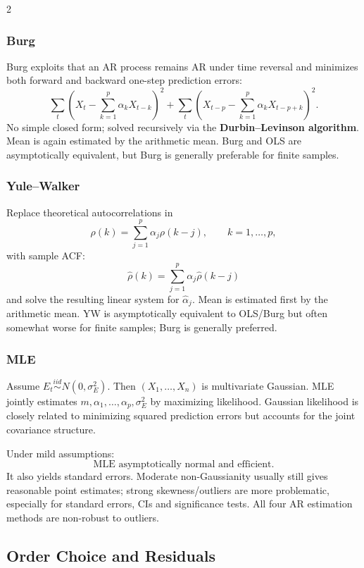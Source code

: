 \documentclass[9pt,a4paper]{extarticle}
\newcommand{\key}[1]{\textbf{#1}}
\begin{document}
\begin{multicols}{2}
\subsubsection*{Burg}

Burg exploits that an AR process remains AR under time reversal and minimizes both forward and backward one-step prediction errors:
\[
\sum_t\left(X_t-\sum_{k=1}^p\alpha_kX_{t-k}\right)^2+
\sum_t\left(X_{t-p}-\sum_{k=1}^p\alpha_kX_{t-p+k}\right)^2.
\]
No simple closed form; solved recursively via the \key{Durbin--Levinson algorithm}. Mean is again estimated by the arithmetic mean. Burg and OLS are asymptotically equivalent, but Burg is generally preferable for finite samples.

\subsubsection*{Yule--Walker}

Replace theoretical autocorrelations in
\[
\rho(k)=\sum_{j=1}^p\alpha_j\rho(k-j),\qquad k=1,\ldots,p,
\]
with sample ACF:
\[
\boxed{\widehat\rho(k)=\sum_{j=1}^p\alpha_j\widehat\rho(k-j)}
\]
and solve the resulting linear system for \(\widehat\alpha_j\). Mean is estimated first by the arithmetic mean. YW is asymptotically equivalent to OLS/Burg but often somewhat worse for finite samples; Burg is generally preferred.

\subsubsection*{MLE}

Assume \(E_t\overset{iid}{\sim}N(0,\sigma_E^2)\). Then \((X_1,\ldots,X_n)\) is multivariate Gaussian. MLE jointly estimates \(m,\alpha_1,\ldots,\alpha_p,\sigma_E^2\) by maximizing likelihood. Gaussian likelihood is closely related to minimizing squared prediction errors but accounts for the joint covariance structure.

Under mild assumptions:
\[
\boxed{\text{MLE asymptotically normal and efficient}.}
\]
It also yields standard errors. Moderate non-Gaussianity usually still gives reasonable point estimates; strong skewness/outliers are more problematic, especially for standard errors, CIs and significance tests. All four AR estimation methods are non-robust to outliers.

\subsection{Order Choice and Residuals}


\end{multicols}
\end{document}
